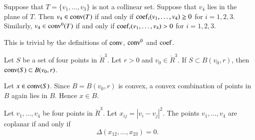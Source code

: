 \begin{tarskidata}
\begin{tarski}

\begin{lemma}
Suppose
that $T=\{v_1,\ldots,v_3\}$ is not a collinear
set. 
Suppose that $v_4$ lies in the plane of $T$.  
 Then $v_4\in{\operatorname{conv}}(T)$ if and only
if  
${\operatorname{coef}}_i(v_1,\ldots,v_4)\ge0$ 
for $i=1,2,3$.
Similarly, $v_4\in{\operatorname{conv}}^0(T)$ if and only
if  
${\operatorname{coef}}_i(v_1,\ldots,v_4)>0$ 
for $i=1,2,3$.
\end{lemma}

\begin{proved}  This is trivial by the definitions
of ${\operatorname{conv}}$, ${\operatorname{conv}}^0$ and ${\operatorname{coef}}$.
\swallowed\end{proved}
\end{tarski}





\begin{tarski}

\begin{lemma}
Let $S$ be a set of four points in $\ring{R}^3$.
Let $r>0$ and $v_0\in\ring{R}^3$.  If $S\subset B(v_0,r)$, then
${\operatorname{conv}}(S)\subset B(v_0,r)$.
\end{lemma}

\begin{proved}  Let $x\in {\operatorname{conv}}(S)$.
Since $B=B(v_0,r)$ is convex,  a convex combination of points in $B$
again lies in $B$.  Hence $x\in B$.
\swallowed\end{proved}
\end{tarski}


\begin{tarski}

\begin{lemma}
Let $v_1,\ldots,v_4$ be four points
in $\ring{R}^3$.  Let $x_{ij} = |v_i-v_j|^2$.
The points $v_1,\ldots,v_4$ are coplanar if and only if
	$$\Delta(x_{12},\ldots,x_{23}) = 0.$$
\end{lemma}


\end{tarski}
\end{tarskidata}
